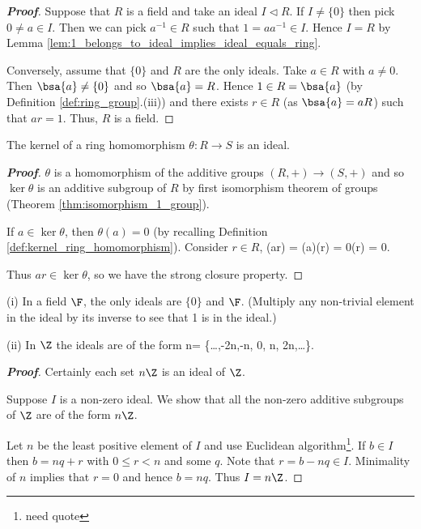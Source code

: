 \begin{proof}[\bf Proof]
Suppose that $R$ is a field and take an ideal $I \lhd R$. If $I \neq\{0\}$ then pick $0 \neq a \in I$. Then we can pick $a^{-1} \in R$ such that $1 = aa^{-1} \in I$. Hence $I = R$ by Lemma \ref{lem:1_belongs_to_ideal_implies_ideal_equals_ring}.

Conversely, assume that $\{0\}$ and $R$ are the only ideals. Take $a \in R$ with $a \neq 0$. Then $\bsa{a} \neq \{0\}$ and so $\bsa{a} = R$. Hence $1 \in R = \bsa{a}$ (by Definition \ref{def:ring_group}.(iii)) and there exists $r\in R$ (as $\bsa{a} = aR$) such that $ar = 1$. Thus, $R$ is a field.
\end{proof}


\begin{lemma}\label{lem:kernel_ring_ideal}
The kernel of a ring homomorphism $\theta : R \to S$ is an ideal.
\end{lemma}

\begin{proof}[\bf Proof]
$\theta$ is a homomorphism of the additive groups $(R, +) \to (S, +)$ and so $\ker \theta$ is an additive subgroup of $R$ by first isomorphism theorem of groups (Theorem \ref{thm:isomorphism_1_group}).

If $a \in \ker \theta$, then $\theta(a) = 0$ (by recalling Definition \ref{def:kernel_ring_homomorphism}). Consider $r\in R$,
\be
\theta(ar) = \theta(a)\theta(r) = 0\cdot\theta(r) = 0.
\ee

Thus $ar \in \ker \theta$, so we have the strong closure property.
\end{proof}

\begin{example}
\ben
\item [(i)] In a field $\F$, the only ideals are $\{0\}$ and $\F$. (Multiply any non-trivial element in the ideal by its inverse to see that 1 is in the ideal.)

\item [(ii)] In $\Z$ the ideals are of the form
\be
n\Z = \{\dots,-2n,-n, 0, n, 2n,\dots \}.
\ee

\begin{proof}[\bf Proof]
Certainly each set $n\Z$ is an ideal of $\Z$.

Suppose $I$ is a non-zero ideal. We show that all the non-zero additive subgroups of $\Z$ are of the form $n\Z$.

Let $n$ be the least positive element of $I$ and use Euclidean algorithm\footnote{need quote}. If $b \in I$ then $b = nq + r$ with $0 \leq r < n$ and some $q$. Note that $r = b - nq \in I$. Minimality of $n$ implies that $r = 0$ and hence $b = nq$. Thus $I = n\Z$.
\end{proof}
\een
\end{example}

